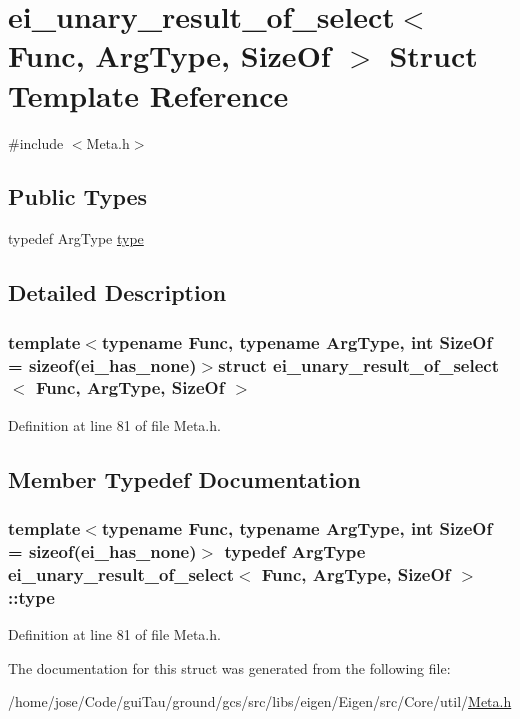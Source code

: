 \hypertarget{structei__unary__result__of__select}{\section{ei\-\_\-unary\-\_\-result\-\_\-of\-\_\-select$<$ Func, Arg\-Type, Size\-Of $>$ Struct Template Reference}
\label{structei__unary__result__of__select}
}


{\ttfamily \#include $<$Meta.\-h$>$}

\subsection*{Public Types}
\begin{DoxyCompactItemize}
\item 
typedef Arg\-Type \hyperlink{structei__unary__result__of__select_ad817f58bc01a0682441e11b57ef34138}{type}
\end{DoxyCompactItemize}


\subsection{Detailed Description}
\subsubsection*{template$<$typename Func, typename Arg\-Type, int Size\-Of = sizeof(ei\-\_\-has\-\_\-none)$>$struct ei\-\_\-unary\-\_\-result\-\_\-of\-\_\-select$<$ Func, Arg\-Type, Size\-Of $>$}



Definition at line 81 of file Meta.\-h.



\subsection{Member Typedef Documentation}
\hypertarget{structei__unary__result__of__select_ad817f58bc01a0682441e11b57ef34138}{
\subsubsection[{type}]{\setlength{\rightskip}{0pt plus 5cm}template$<$typename Func, typename Arg\-Type, int Size\-Of = sizeof(ei\-\_\-has\-\_\-none)$>$ typedef Arg\-Type {\bf ei\-\_\-unary\-\_\-result\-\_\-of\-\_\-select}$<$ Func, Arg\-Type, Size\-Of $>$\-::{\bf type}}}\label{structei__unary__result__of__select_ad817f58bc01a0682441e11b57ef34138}


Definition at line 81 of file Meta.\-h.



The documentation for this struct was generated from the following file\-:\begin{DoxyCompactItemize}
\item 
/home/jose/\-Code/gui\-Tau/ground/gcs/src/libs/eigen/\-Eigen/src/\-Core/util/\hyperlink{_meta_8h}{Meta.\-h}\end{DoxyCompactItemize}
